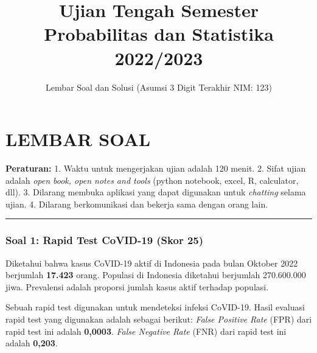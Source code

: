 \documentclass[
  letterpaper,
  DIV=11,
  numbers=noendperiod]{scrartcl}
\title{Ujian Tengah Semester Probabilitas dan Statistika 2022/2023}
\subtitle{Lembar Soal dan Solusi (Asumsi 3 Digit Terakhir NIM: 123)}
\author{}
\date{}
\renewcommand*\contentsname{Table of contents}
\newcommand\contentsname{Table of contents}
\begin{document}
\maketitle

\renewcommand*\contentsname{Table of contents}
{
\setcounter{tocdepth}{3}
\tableofcontents
}

\section{LEMBAR SOAL}\label{lembar-soal}

\textbf{Peraturan:} 1. Waktu untuk mengerjakan ujian adalah 120 menit.
2. Sifat ujian adalah \emph{open book, open notes and tools} (python
notebook, excel, R, calculator, dll). 3. Dilarang membuka aplikasi yang
dapat digunakan untuk \emph{chatting} selama ujian. 4. Dilarang
berkomunikasi dan bekerja sama dengan orang lain.

\begin{center}\rule{0.5\linewidth}{0.5pt}\end{center}

\subsubsection{\texorpdfstring{\textbf{Soal 1: Rapid Test CoVID-19 (Skor
25)}}{Soal 1: Rapid Test CoVID-19 (Skor 25)}}\label{soal-1-rapid-test-covid-19-skor-25}

Diketahui bahwa kasus CoVID-19 aktif di Indonesia pada bulan Oktober
2022 berjumlah \textbf{17.423} orang. Populasi di Indonesia diketahui
berjumlah 270.600.000 jiwa. Prevalensi adalah proporsi jumlah kasus
aktif terhadap populasi.

Sebuah rapid test digunakan untuk mendeteksi infeksi CoVID-19. Hasil
evaluasi rapid test yang digunakan adalah sebagai berikut: \emph{False
Positive Rate} (FPR) dari rapid test ini adalah \textbf{0,0003}.
\emph{False Negative Rate} (FNR) dari rapid test ini adalah
\textbf{0,203}.
\end{document}
